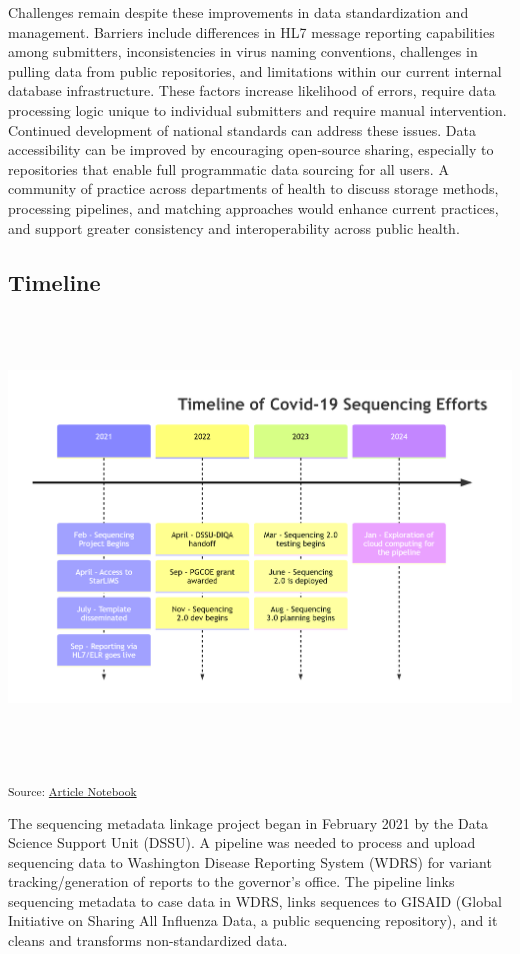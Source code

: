 \documentclass[
  letterpaper,
  DIV=11,
  numbers=noendperiod]{scrartcl}
\begin{document}
Challenges remain despite these improvements in data standardization and
management. Barriers include differences in HL7 message reporting
capabilities among submitters, inconsistencies in virus naming
conventions, challenges in pulling data from public repositories, and
limitations within our current internal database infrastructure. These
factors increase likelihood of errors, require data processing logic
unique to individual submitters and require manual intervention.
Continued development of national standards can address these issues.
Data accessibility can be improved by encouraging open-source sharing,
especially to repositories that enable full programmatic data sourcing
for all users. A community of practice across departments of health to
discuss storage methods, processing pipelines, and matching approaches
would enhance current practices, and support greater consistency and
interoperability across public health.

\subsection{Timeline}\label{timeline}

\includegraphics[width=7in,height=4.63in]{index_files/figure-latex/mermaid-figure-13.png}

\textsubscript{Source:
\href{https://NW-PaGe.github.io/sequencing_integration_pipeline1.0/index.qmd.html}{Article
Notebook}}

The sequencing metadata linkage project began in February 2021 by the
Data Science Support Unit (DSSU). A pipeline was needed to process and
upload sequencing data to Washington Disease Reporting System (WDRS) for
variant tracking/generation of reports to the governor's
office\hspace{0pt}. The pipeline links sequencing metadata to case data
in WDRS, links sequences to GISAID (Global Initiative on Sharing All
Influenza Data, a public sequencing repository), and it cleans and
transforms non-standardized data.
\end{document}
